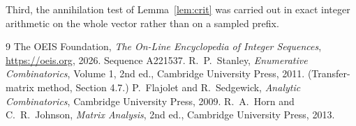 \documentclass[11pt,a4paper]{article}
\theoremstyle{plain}
\theoremstyle{definition}
\begin{document}
Third, the annihilation test of Lemma~\ref{lem:crit} was carried out in exact integer
arithmetic on the whole vector rather than on a sampled prefix.

\begin{thebibliography}{9}
 The OEIS Foundation, \emph{The On-Line Encyclopedia of Integer
Sequences}, \url{https://oeis.org}, 2026. Sequence A221537.
 R.~P.~Stanley, \emph{Enumerative Combinatorics}, Volume 1, 2nd ed.,
Cambridge University Press, 2011. (Transfer-matrix method, Section 4.7.)
 P.~Flajolet and R.~Sedgewick, \emph{Analytic Combinatorics}, Cambridge
University Press, 2009.
 R.~A.~Horn and C.~R.~Johnson, \emph{Matrix Analysis}, 2nd ed., Cambridge
University Press, 2013.
\end{thebibliography}
\end{document}
